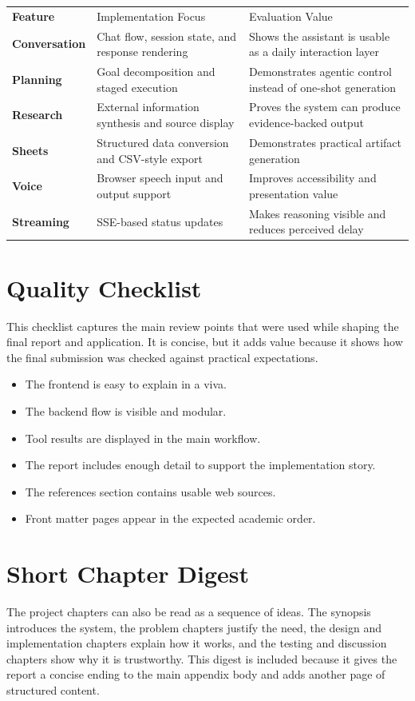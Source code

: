 \documentclass[11pt,oneside]{report}
\begin{document}
\begin{tabularx}{\textwidth}{>{\bfseries}p{}p{}X}
Feature & Implementation Focus & Evaluation Value \\
Conversation & Chat flow, session state, and response rendering & Shows the assistant is usable as a daily interaction layer \\
Planning & Goal decomposition and staged execution & Demonstrates agentic control instead of one-shot generation \\
Research & External information synthesis and source display & Proves the system can produce evidence-backed output \\
Sheets & Structured data conversion and CSV-style export & Demonstrates practical artifact generation \\
Voice & Browser speech input and output support & Improves accessibility and presentation value \\
Streaming & SSE-based status updates & Makes reasoning visible and reduces perceived delay \\
\end{tabularx}

\section{Quality Checklist}
This checklist captures the main review points that were used while shaping the final report and application. It is concise, but it adds value because it shows how the final submission was checked against practical expectations.

\begin{itemize}[leftmargin=1.2cm]
  \item The frontend is easy to explain in a viva.
  \item The backend flow is visible and modular.
  \item Tool results are displayed in the main workflow.
  \item The report includes enough detail to support the implementation story.
  \item The references section contains usable web sources.
  \item Front matter pages appear in the expected academic order.
\end{itemize}

\section{Short Chapter Digest}
The project chapters can also be read as a sequence of ideas. The synopsis introduces the system, the problem chapters justify the need, the design and implementation chapters explain how it works, and the testing and discussion chapters show why it is trustworthy. This digest is included because it gives the report a concise ending to the main appendix body and adds another page of structured content.
\end{document}
